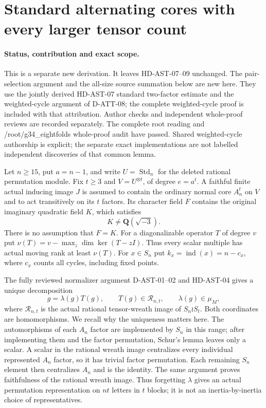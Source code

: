 \section{Standard alternating cores with every larger tensor count}
\label{sec:standard-all-tensors}

\paragraph{Status, contribution and exact scope.}
This is a separate new derivation.  It leaves HD-AST-07--09 unchanged.
The pair-selection argument and the all-size source summation below are
new here.  They use the jointly derived HD-AST-07 standard two-factor
estimate and the weighted-cycle argument of D-ATT-08; the complete
weighted-cycle proof is included with that attribution.  Author checks
and independent whole-proof reviews are recorded separately.  The complete root reading and /root/g34\_eightfolds whole-proof
audit have passed. Shared weighted-cycle authorship is explicit;
the separate exact implementations are not labelled independent
discoveries of that common lemma.

Let $n\ge15$, put $a=n-1$, and write $U=\operatorname{Std}_n$
for the deleted rational permutation module.  Fix $t\ge3$ and
$V=U^{\otimes t}$, of degree $e=a^t$.  A faithful finite actual
inducing image $J$ is assumed to contain the ordinary normal core
$A_n^t$ on $V$ and to act transitively on its $t$ factors.  Its
character field $F$ contains the original imaginary quadratic field
$K$, which satisfies
\[
                    K\ne\mathbf Q(\sqrt{-3}).                 \tag{AST3.1}
\]
There is no assumption that $F=K$.  For a diagonalizable operator
$T$ of degree $v$ put
$\nu(T)=v-\max_z\dim\ker(T-zI)$.  Thus every scalar multiple
has actual moving rank at least $\nu(T)$.  For $x\in S_n$ put
$k_x=\operatorname{ind}(x)=n-c_x$, where $c_x$ counts all cycles,
including fixed points.

The fully reviewed normalizer argument D-AST-01--02 and
HD-AST-04 gives a unique decomposition
\[
             g=\lambda(g)T(g),\qquad
 T(g)\in\mathcal R_{n,t},\qquad \lambda(g)\in\mu_M,              \tag{AST3.2}
\]
where $\mathcal R_{n,t}$ is the actual rational tensor-wreath image
of $S_n\wr S_t$.  Both coordinates are homomorphisms.  We recall
why the uniqueness matters here.  The automorphisms of each $A_n$
factor are implemented by $S_n$ in this range; after implementing
them and the factor permutation, Schur's lemma leaves only a scalar.
A scalar in the rational wreath image centralizes every individual
represented $A_n$ factor, so it has trivial factor permutation.
Each remaining $S_n$ element then centralizes $A_n$ and is the
identity.  The same argument proves faithfulness of the rational
wreath image.  Thus forgetting $\lambda$ gives an actual
permutation representation on $nt$ letters in $t$ blocks; it is
not an inertia-by-inertia choice of representatives.

